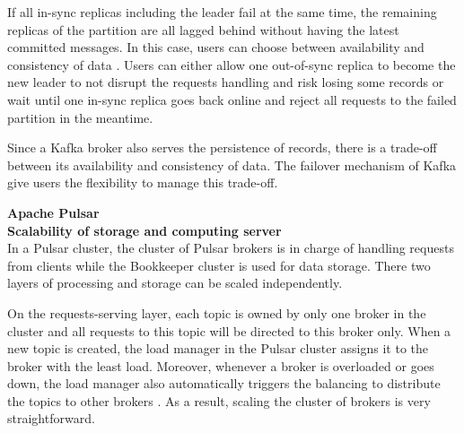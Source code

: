 If all in-sync replicas including the leader fail at the same time, the remaining replicas of the partition are all lagged behind without having the latest committed messages. In this case, users can choose between availability and consistency of data \cite{kafkadatareplication}. Users can either allow one out-of-sync replica to become the new leader to not disrupt the requests handling and risk losing some records or wait until one in-sync replica goes back online and reject all requests to the failed partition in the meantime. 

Since a Kafka broker also serves the persistence of records, there is a trade-off between its availability and consistency of data. The failover mechanism of Kafka give users the flexibility to manage this trade-off.

\large \textbf{Apache Pulsar}\\
\normalsize
\textbf{Scalability of storage and computing server}\\
In a Pulsar cluster, the cluster of Pulsar brokers is in charge of handling requests from clients while the Bookkeeper cluster is used for data storage. There two layers of processing and storage can be scaled independently.

On the requests-serving layer, each topic is owned by only one broker in the cluster and all requests to this topic will be directed to this broker only. When a new topic is created, the load manager in the Pulsar cluster assigns it to the broker with the least load. Moreover, whenever a broker is overloaded or goes down, the load manager also automatically triggers the balancing to distribute the topics to other brokers \cite{pulsarloadbalance}. As a result, scaling the cluster of brokers is very straightforward. 


